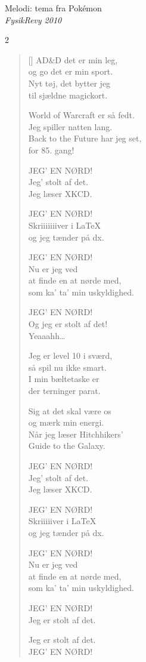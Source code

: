 \newpage


{Melodi: tema fra Pokémon}\\[.2em]
{\small\itshape FysikRevy 2010}

\begin{multicols}2
\settowidth{\versewidth}{World of Warcraft er så fedt.}
\begin{verse}[\versewidth]
AD\&D det er min leg,\\
og go det er min sport.\\
Nyt tøj, det bytter jeg\\
til sjældne magickort.

World of Warcraft er så fedt.\\
Jeg spiller natten lang.\\
Back to the Future har jeg set,\\
for 85. gang!

JEG’ EN NØRD!\\
Jeg’ stolt af det.\\
Jeg læser XKCD.

JEG’ EN NØRD!\\
Skriiiiiiiver i \LaTeX\\
og jeg tænder på dx.

JEG’ EN NØRD!\\
Nu er jeg ved\\
at finde en at nørde med,\\
som ka’ ta’ min uskyldighed.

JEG’ EN NØRD!\\
Og jeg er stolt af det!\\
Yeaaahh…

\columnbreak
Jeg er level 10 i sværd,\\
så spil nu ikke smart.\\
I min bæltetaske er\\
der terninger parat.

Sig at det skal være os\\
og mærk min energi.\\
Når jeg læser Hitchhikers’\\
Guide to the Galaxy.

JEG’ EN NØRD!\\
Jeg’ stolt af det.\\
Jeg læser XKCD.

JEG’ EN NØRD!\\
Skriiiiiver i \LaTeX\\
og jeg tænder på dx.

JEG’ EN NØRD!\\
Nu er jeg ved\\
at finde en at nørde med,\\
som ka’ ta’ min uskyldighed.

JEG’ EN NØRD!\\
Jeg er stolt af det.

Jeg er stolt af det.\\
JEG’ EN NØRD!
\end{verse}
\end{multicols}

